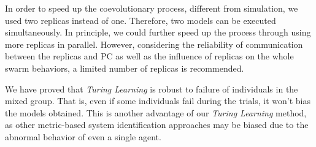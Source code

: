 In order to speed up the coevolutionary process, different from simulation, we used two replicas instead of one. Therefore, two models can be executed simultaneously. In principle, we could further speed up the process through using more replicas in parallel. However, considering the reliability of communication between the replicas and PC as well as the influence of replicas on the whole swarm behaviors, a limited number of replicas is recommended. 

We have proved that \textit{Turing Learning} is robust to failure of individuals in the mixed group. That is, even if some individuals fail during the trials, it won't bias the models obtained. This is another advantage of our \textit{Turing Learning} method, as other metric-based system identification approaches may be biased due to the abnormal behavior of even a single agent.

